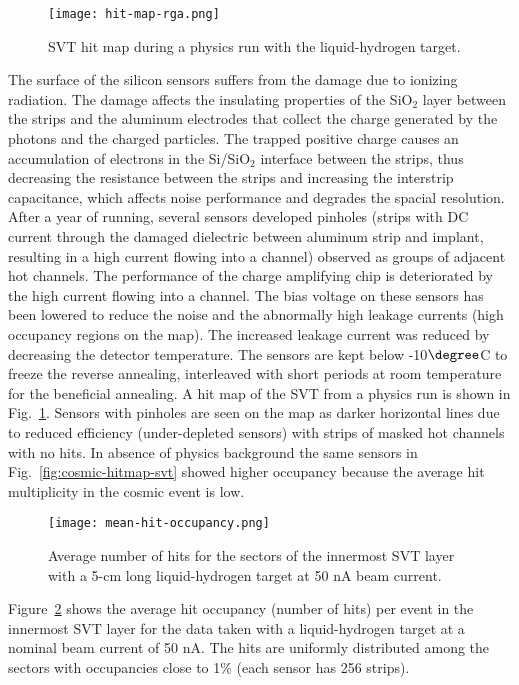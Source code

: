 \begin{figure}[hbt] 
\centering 
\texttt{[image: hit-map-rga.png]}
\caption{SVT hit map during a physics run with the liquid-hydrogen target.}
\label{fig:hit-map-rga}
\end{figure}

The surface of the silicon sensors suffers from the damage due to ionizing radiation. The damage affects the insulating properties of the SiO$_2$ layer between the strips and the aluminum electrodes that collect the charge generated by the photons and the charged particles. The trapped positive charge causes an accumulation of electrons in the Si/SiO$_2$ interface between the strips, thus decreasing the resistance between the strips and increasing the interstrip capacitance, which affects noise performance and degrades the spacial resolution. After a year of running, several sensors developed pinholes (strips with DC current through the damaged dielectric between aluminum strip and implant, resulting in a high current flowing into a channel) observed as groups of adjacent hot channels. The performance of the charge amplifying chip is deteriorated by the high current flowing into a channel. The bias voltage on these sensors has been lowered to reduce the noise and the abnormally high leakage currents (high occupancy regions on the map). The increased leakage current was reduced by decreasing the detector temperature. The sensors are kept below -10$\degree$C to freeze the reverse annealing, interleaved with short periods at room temperature for the beneficial annealing. A hit map of the SVT from a physics run is shown in Fig.~\ref{fig:hit-map-rga}. Sensors with pinholes are seen on the map as darker horizontal lines due to reduced efficiency (under-depleted sensors) with strips of masked hot channels with no hits. In absence of physics background the same sensors in Fig.~\ref{fig:cosmic-hitmap-svt} showed higher occupancy because the average hit multiplicity in the cosmic event is low. 

\begin{figure}[hbt] 
\centering 
\texttt{[image: mean-hit-occupancy.png]}
\caption{Average number of hits for the sectors of the innermost SVT layer with a 5-cm long liquid-hydrogen target at 50 nA beam current.}
\label{fig:mean-hit-occupancy}
\end{figure}

Figure~\ref{fig:mean-hit-occupancy} shows the average hit occupancy (number of hits) per event in the innermost SVT layer for the data taken with a liquid-hydrogen target at a nominal beam current of 50 nA. The hits are uniformly distributed among the sectors with occupancies close to 1$\%$ (each sensor has 256 strips).

